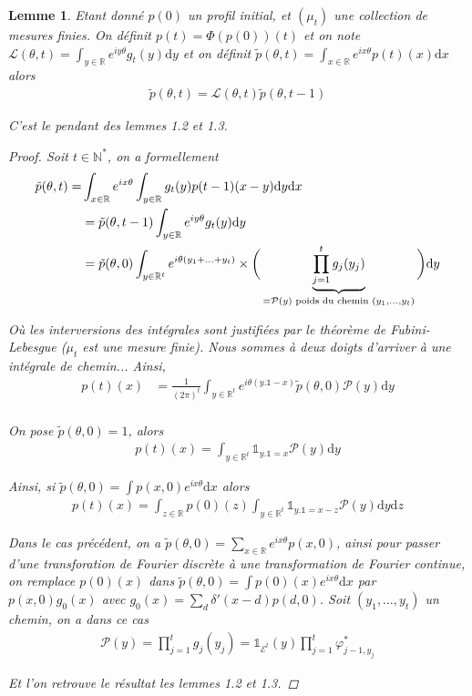 \documentclass{article}
\newtheorem{lemma}[theorem]{Lemme}
\begin{document}
\begin{lemma}
	Etant donné $p(0)$ un profil initial, et $(\mu_t)$ une collection de mesures finies. On définit $p(t) = \Phi(p(0))(t)$ et on note $\mathcal{L}(\theta,t) = \int_{y\in\mathbb{R}}e^{iy \theta}g_t(y)\mathrm{d}y$ et on définit $\tilde{p}(\theta, t) = \int_{x\in\mathbb{R}} e^{i x \theta} p(t)(x)\mathrm{d}x$ alors 
	\begin{align*}
		\tilde{p}(\theta, t) = \mathcal{L}(\theta, t) \tilde{p}(\theta, t-1)
	\end{align*}

	C'est le pendant des lemmes 1.2 et 1.3.
	\begin{proof}
		Soit $t\in \mathbb{N}^*$, on a formellement
		\begin{align*}
			\tilde{p}(\theta, t) = &\int_{x\in\mathbb{R}}e^{ix\theta}\int_{y\in\mathbb{R}} g_t(y)p(t-1)(x-y)\mathrm{d}y\mathrm{d}x\\
			&= \tilde{p}(\theta, t-1)\int_{y\in\mathbb{R}}e^{iy\theta}g_t(y)\mathrm{d}y\\
			&= \tilde{p}(\theta, 0) \int_{y\in\mathbb{R}^t}e^{i\theta(y_1+\ldots+y_t)}\times\bigg(\underbrace{\prod_{j=1}^t g_j(y_j)}_{=\mathcal{P}(y) \textup{ poids du chemin } (y_1,\ldots, y_t)}\bigg)\mathrm{d}y
		\end{align*}

		Où les interversions des intégrales sont justifiées par le théorème de Fubini-Lebesgue ($\mu_t$ est une mesure finie). Nous sommes à deux doigts d'arriver à une intégrale de chemin... Ainsi,  
		\begin{align*}
			p(t)(x) &= \frac{1}{(2\pi)^t}\int_{y\in\mathbb{R}^t}e^{i\theta (y.\mathds{1}-x)}\tilde{p}(\theta, 0)\mathcal{P}(y) \mathrm{d}y\\
		\end{align*}

		On pose $\tilde{p}(\theta, 0)=1$, alors
		\begin{align*}
			p(t)(x) = \int_{y\in\mathbb{R}^t}\mathds{1}_{y.\mathds{1}=x} \mathcal{P}(y)\mathrm{d}y
		\end{align*}

		Ainsi, si $\tilde{p}(\theta, 0) = \int p(x,0)e^{i x \theta}\mathrm{d}x$ alors 
		\begin{align*}
			p(t)(x) = \int_{z\in\mathbb{R}} p(0)(z)\int_{y\in\mathbb{R}^t}\mathds{1}_{y.\mathds{1}=x-z}\mathcal{P}(y)\mathrm{d}y\mathrm{d}z
		\end{align*}

		Dans le cas précédent, on a $\tilde{p}(\theta, 0) = \sum_{x\in\mathbb{R}}e^{ix \theta}p(x,0)$, ainsi pour passer d'une transforation de Fourier discrète à une transformation de Fourier continue, on remplace $p(0)(x)$ dans $\tilde{p}(\theta, 0) = \int p(0)(x)e^{ix\theta}\mathrm{d}x$ par $p(x,0)g_0(x)$ avec $g_0(x) = \sum_{d}\delta'(x-d)p(d,0)$. Soit $(y_1,\ldots,y_t)$ un chemin, on a dans ce cas
		\begin{align*}
		\mathcal{P}(y) = \prod_{j=1}^t g_j(y_j) = \mathds{1}_{\mathcal{E}^t}(y) \prod_{j=1}^t \varphi^*_{j-1,y_j}
		\end{align*}

		Et l'on retrouve le résultat les lemmes 1.2 et 1.3.
	\end{proof}
\end{lemma}
\end{document}
